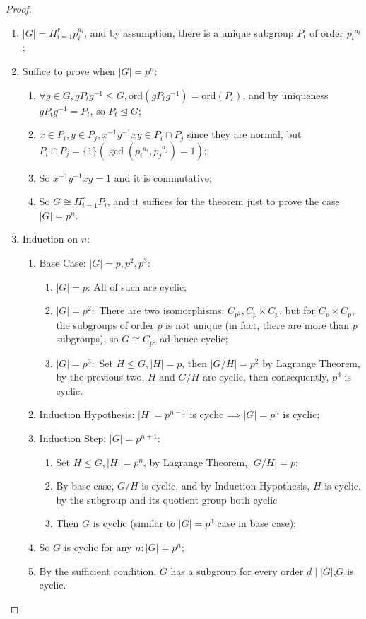 \documentclass[11pt]{article}
\newcommand{\ord}{\text{ord}}
\begin{document}
\begin{proof}
~
    \begin{enumerate}
        \item $|G|=\Pi_{i=1}^rp_i^{a_i}$, and by assumption, there is a unique subgroup $P_t$ of order ${p_t}^{a_t}$;
        \item Suffice to prove when $|G|=p^n$:
        \begin{enumerate}
            \item $\forall g\in G, gP_tg^{-1}\leq G, \ord (gP_tg^{-1})=\ord(P_t)$, and by uniqueness $gP_tg^{-1}=P_t$, so $P_t\trianglelefteq G$;
            \item $x\in P_i,y\in P_j, x^{-1}y^{-1}xy\in P_i\cap P_j$ since they are normal, but $P_i\cap P_j=\{1\}(\gcd({p_i}^{a_i},{p_j}^{a_j})=1)$;
            \item So $x^{-1}y^{-1}xy=1$ and it is commutative;
            \item So $G\cong \Pi_{i=1}^r P_i$, and it suffices for the theorem just to prove the case $|G|=p^n$.
        \end{enumerate}
        \item Induction on $n$:
        \begin{enumerate}
            \item Base Case: $|G|=p,p^2,p^3$:
            \begin{enumerate}
                \item $|G|=p$: All of such are cyclic;
                \item $|G|=p^2:$ There are two isomorphisms: $C_{p^2},C_p\times C_p$, but for $C_p\times C_p$, the subgroups of order $p$ is not unique (in fact, there are more than $p$ subgroups), so $G\cong C_{p^2}$ ad hence cyclic;
                \item $|G|=p^3:$ Set $H\leq G,|H|=p$, then $|G/H|=p^2$ by Lagrange Theorem, by the previous two, $H$ and $G/H$ are cyclic, then consequently, $p^3$ is cyclic.
            \end{enumerate}
            \item Induction Hypothesis: $|H|=p^{n-1}$ is cyclic$\implies |G|=p^{n}$ is cyclic;
            \item Induction Step: $|G|=p^{n+1}$:
            \begin{enumerate}
                \item Set $H\leq G, |H|=p^n$, by Lagrange Theorem, $|G/H|=p$;
                \item By base case, $G/H$ is cyclic, and by Induction Hypothesis, $H$ is cyclic, by the subgroup and its quotient group both cyclic
                \item Then $G$ is cyclic (similar to $|G|=p^3$ case in base case);
            \end{enumerate}
            \item So $G$ is cyclic for any $n:|G|=p^n$;
            \item By the sufficient condition, $G$ has a subgroup for every order $d\mid|G|$,$G$ is cyclic.
        \end{enumerate}
    \end{enumerate}
\end{proof}
\end{document}
